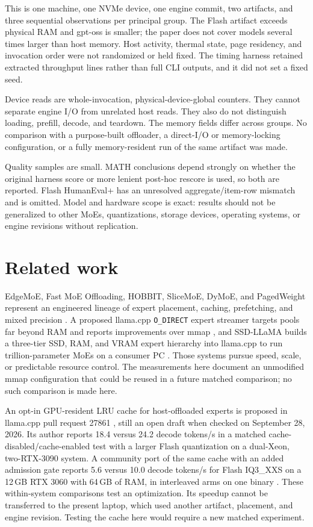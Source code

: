 \documentclass[11pt]{article}
\newcommand{\q}[1]{\texttt{#1}}
\begin{document}
This is one machine, one NVMe device, one engine commit, two artifacts, and
three sequential observations per principal group. The Flash artifact exceeds
physical RAM and gpt-oss is smaller; the paper does not cover models several
times larger than host memory. Host activity, thermal
state, page residency, and invocation order were not randomized or held fixed.
The timing harness retained extracted throughput lines rather than full CLI
outputs, and it did not set a fixed seed.

Device reads are whole-invocation, physical-device-global counters. They cannot
separate engine I/O from unrelated host reads. They also do not distinguish
loading, prefill, decode, and teardown. The memory fields differ across groups.
No comparison with a purpose-built offloader, a direct-I/O or memory-locking
configuration, or a fully memory-resident run of the same artifact was made.

Quality samples are small. MATH conclusions depend strongly on whether the
original harness score or more lenient post-hoc rescore is used, so both are
reported. Flash HumanEval+
has an unresolved aggregate/item-row mismatch and is omitted. Model and
hardware scope is exact: results should not be generalized to other MoEs,
quantizations, storage devices, operating systems, or engine revisions without
replication.

\section{Related work}

EdgeMoE, Fast MoE Offloading, HOBBIT, SliceMoE, DyMoE, and PagedWeight represent
an engineered lineage of expert placement, caching, prefetching, and mixed
precision \citep{edgemoe2023,mixtraloffload2023,hobbit2024,slicemoe2025,
dymoe2026,pagedweight2026}. A proposed llama.cpp \q{O\_DIRECT} expert streamer
targets pools far beyond RAM and reports improvements over mmap
\citep{llamacpp2026streampr}, and SSD-LLaMA builds a three-tier SSD, RAM, and
VRAM expert hierarchy into llama.cpp to run trillion-parameter MoEs on a
consumer PC \citep{liang2026ssdllama}. Those systems pursue speed, scale, or predictable
resource control. The measurements here document an unmodified mmap
configuration that could be reused in a future matched comparison; no such
comparison is made here.

An opt-in GPU-resident LRU cache for host-offloaded experts is proposed in
llama.cpp pull request 27861 \citep{llamacpp2026moecachepr}, still an open
draft when checked on September 28, 2026. Its author reports 18.4 versus 24.2
decode tokens/s in a matched cache-disabled/cache-enabled test with a larger
Flash quantization on a dual-Xeon, two-RTX-3090 system. A community port of the
same cache with an added admission gate reports 5.6 versus 10.0 decode tokens/s
for Flash IQ3\_XXS on a 12\,GB RTX 3060 with 64\,GB of RAM, in interleaved
arms on one binary \citep{llamacpp2026moecachepr}. These within-system
comparisons test an optimization. Its speedup cannot be transferred to the present
laptop, which used another artifact, placement, and engine revision. Testing
the cache here would require a new matched experiment.
\end{document}
